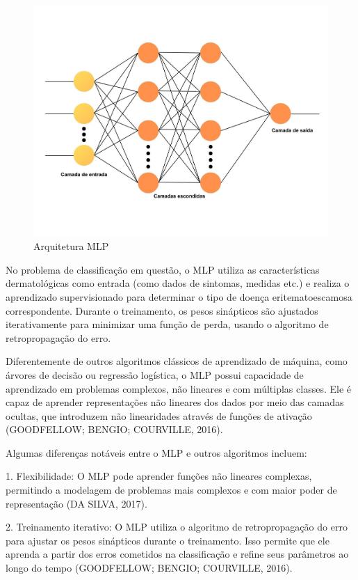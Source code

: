 \documentclass[conference]{IEEEtran}
\begin{document}
\begin{figure}[htbp]
    \centerline{\includegraphics[width = 1.0\linewidth]{./figuras/figura2.jpg}}
    \caption{Arquitetura MLP}
    \label{fig:mlp}
\end{figure}

No problema de classificação em questão, o MLP utiliza as características dermatológicas como entrada (como dados de sintomas, medidas etc.) e realiza o aprendizado supervisionado para determinar o tipo de doença eritematoescamosa correspondente. Durante o treinamento, os pesos sinápticos são ajustados iterativamente para minimizar uma função de perda, usando o algoritmo de retropropagação do erro.

Diferentemente de outros algoritmos clássicos de aprendizado de máquina, como árvores de decisão ou regressão logística, o MLP possui capacidade de aprendizado em problemas complexos, não lineares e com múltiplas classes. Ele é capaz de aprender representações não lineares dos dados por meio das camadas ocultas, que introduzem não linearidades através de funções de ativação (GOODFELLOW; BENGIO; COURVILLE, 2016).

Algumas diferenças notáveis entre o MLP e outros algoritmos incluem:

1. Flexibilidade: O MLP pode aprender funções não lineares complexas, permitindo a modelagem de problemas mais complexos e com maior poder de representação (DA SILVA, 2017).

2. Treinamento iterativo: O MLP utiliza o algoritmo de retropropagação do erro para ajustar os pesos sinápticos durante o treinamento. Isso permite que ele aprenda a partir dos erros cometidos na classificação e refine seus parâmetros ao longo do tempo (GOODFELLOW; BENGIO; COURVILLE, 2016).
\end{document}
